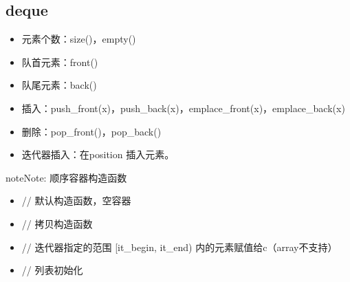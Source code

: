 \documentclass[letterpaper,10pt,english]{sphinxmanual}
\begin{document}
\subsection{deque}
\label{\detokenize{cpp/19_stl:deque}}
%
\begin{sphinxVerbatim}[commandchars=\\\{\}]
\end{sphinxVerbatim}

\begin{itemize}
\item {} 
元素个数：size()，empty()

\item {} 
队首元素：front()

\item {} 
队尾元素：back()

\item {} 
插入：push\_front(x)，push\_back(x)，emplace\_front(x)，emplace\_back(x)

\item {} 
删除：pop\_front()，pop\_back()

\item {} 
迭代器插入：在position  插入元素。

%
\begin{sphinxVerbatim}[commandchars=\\\{\}]
      

  
     
\end{sphinxVerbatim}

\end{itemize}

\begin{sphinxadmonition}{note}{Note:}
顺序容器构造函数
\begin{itemize}
\item {} 
 // 默认构造函数，空容器

\item {} 
 // 拷贝构造函数

\item {} 
 // 迭代器指定的范围 {[}it\_begin, it\_end) 内的元素赋值给c（array不支持）

\item {} 
 // 列表初始化

\end{itemize}
\end{sphinxadmonition}
\end{document}
